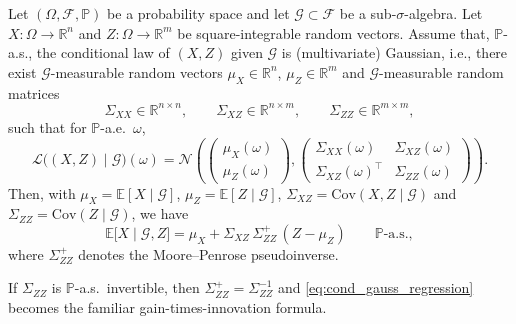 \begin{lemma}\label{lem:cond_gauss_regression}
Let $(\Omega,\mathcal F,\mathbb P)$ be a probability space and let $\mathcal G\subset\mathcal F$ be a sub-$\sigma$-algebra.
Let $X:\Omega\to\mathbb R^{n}$ and $Z:\Omega\to\mathbb R^{m}$ be square-integrable random vectors.
Assume that, $\mathbb P$-a.s., the conditional law of $(X,Z)$ given $\mathcal G$ is (multivariate) Gaussian, i.e.,
there exist $\mathcal G$-measurable random vectors $\mu_X\in\mathbb R^{n}$, $\mu_Z\in\mathbb R^{m}$ and
$\mathcal G$-measurable random matrices
\[
\Sigma_{XX}\in\mathbb R^{n\times n},\qquad
\Sigma_{XZ}\in\mathbb R^{n\times m},\qquad
\Sigma_{ZZ}\in\mathbb R^{m\times m},
\]
such that for $\mathbb P$-a.e.\ $\omega$,
\[
\mathcal L\big((X,Z)\mid \mathcal G\big)(\omega)
=\mathcal N\!\left(
\begin{pmatrix}\mu_X(\omega)\\ \mu_Z(\omega)\end{pmatrix},
\begin{pmatrix}\Sigma_{XX}(\omega) & \Sigma_{XZ}(\omega)\\
\Sigma_{XZ}(\omega)^\top & \Sigma_{ZZ}(\omega)
\end{pmatrix}
\right).
\]
Then, with $\mu_X=\mathbb E[X\mid \mathcal G]$, $\mu_Z=\mathbb E[Z\mid \mathcal G]$,
$\Sigma_{XZ}=\mathrm{Cov}(X,Z\mid \mathcal G)$ and $\Sigma_{ZZ}=\mathrm{Cov}(Z\mid \mathcal G)$, we have
\begin{equation}\label{eq:cond_gauss_regression}
\mathbb E\big[X\mid \mathcal G, Z\big]
=
\mu_X + \Sigma_{XZ}\,\Sigma_{ZZ}^{+}\,(Z-\mu_Z)
\qquad \mathbb P\text{-a.s.},
\end{equation}
where $\Sigma_{ZZ}^{+}$ denotes the Moore--Penrose pseudoinverse.

If $\Sigma_{ZZ}$ is $\mathbb P$-a.s.\ invertible, then $\Sigma_{ZZ}^{+}=\Sigma_{ZZ}^{-1}$ and
\eqref{eq:cond_gauss_regression} becomes the familiar gain-times-innovation formula.
\end{lemma}

